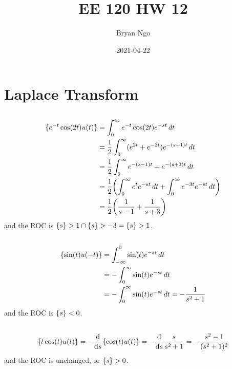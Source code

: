 \documentclass{article}
\title{EE 120 HW 12}
\author{Bryan Ngo}
\date{2021-04-22}
\let\L\relax
\DeclareMathOperator{\L}{\mathcal{L}}
\let\Re\relax
\DeclareMathOperator{\Re}{\mathfrak{R}}
\begin{document}
\maketitle

\section{Laplace Transform}

\subsection{}

\begin{align}
    \L\{e^{-t} \cos(2t) u(t)\} &= \int_0^\infty e^{-t} \cos(2t) e^{-st} \, dt \\
    &= \frac{1}{2} \int_0^\infty (e^{2t} + e^{-2t}) e^{-(s + 1) t} \, dt \\
    &= \frac{1}{2} \int_0^\infty e^{-(s - 1) t} + e^{-(s + 3) t} \, dt \\
    &= \frac{1}{2} \qty(\int_0^\infty e^t e^{-st} \, dt + \int_0^\infty e^{-3t} e^{-st} \, dt) \\
    &= \frac{1}{2} \qty(\frac{1}{s - 1} + \frac{1}{s + 3})
\end{align}
and the ROC is \(\Re\{s\} > 1 \cap \Re\{s\} > -3 = \Re\{s\} > 1\).

\subsection{}

\begin{align}
    \L\{\sin(t) u(-t)\} &= \int_{-\infty}^0 \sin(t) e^{-st} \, dt \\
    &= -\int_0^\infty \sin(t) e^{-st} \, dt \\
    &= -\int_0^\infty \sin(t) e^{-st} \, dt = -\frac{1}{s^2 + 1}
\end{align}
and the ROC is \(\Re\{s\} < 0\).

\subsection{}

\begin{equation}
    \L\{t \cos(t) u(t)\} = -\dv{s} \L\{\cos(t) u(t)\} = -\dv{s} \frac{s}{s^2 + 1} = -\frac{s^2 - 1}{(s^2 + 1)^2}
\end{equation}
and the ROC is unchanged, or \(\Re\{s\} > 0\).
\end{document}
